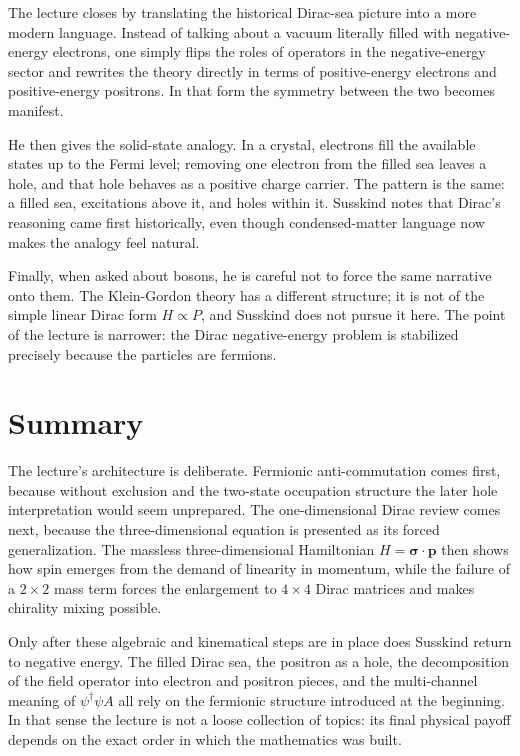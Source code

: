 The lecture closes by translating the historical Dirac-sea picture into a more modern language. Instead of talking about a vacuum literally filled with negative-energy electrons, one simply flips the roles of operators in the negative-energy sector and rewrites the theory directly in terms of positive-energy electrons and positive-energy positrons. In that form the symmetry between the two becomes manifest.

He then gives the solid-state analogy. In a crystal, electrons fill the available states up to the Fermi level; removing one electron from the filled sea leaves a hole, and that hole behaves as a positive charge carrier. The pattern is the same: a filled sea, excitations above it, and holes within it. Susskind notes that Dirac's reasoning came first historically, even though condensed-matter language now makes the analogy feel natural.

Finally, when asked about bosons, he is careful not to force the same narrative onto them. The Klein-Gordon theory has a different structure; it is not of the simple linear Dirac form \(H\propto P\), and Susskind does not pursue it here. The point of the lecture is narrower: the Dirac negative-energy problem is stabilized precisely because the particles are fermions.

\section{Summary}

The lecture's architecture is deliberate. Fermionic anti-commutation comes first, because without exclusion and the two-state occupation structure the later hole interpretation would seem unprepared. The one-dimensional Dirac review comes next, because the three-dimensional equation is presented as its forced generalization. The massless three-dimensional Hamiltonian \(H=\boldsymbol{\sigma}\cdot\mathbf p\) then shows how spin emerges from the demand of linearity in momentum, while the failure of a \(2\times2\) mass term forces the enlargement to \(4\times4\) Dirac matrices and makes chirality mixing possible.

Only after these algebraic and kinematical steps are in place does Susskind return to negative energy. The filled Dirac sea, the positron as a hole, the decomposition of the field operator into electron and positron pieces, and the multi-channel meaning of \(\psi^\dagger\psi A\) all rely on the fermionic structure introduced at the beginning. In that sense the lecture is not a loose collection of topics: its final physical payoff depends on the exact order in which the mathematics was built.